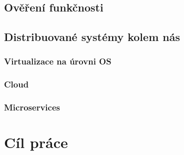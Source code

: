 \documentclass[
  master,
  biblatex,
  glossaries,
  index
]{kidiplom}
\begin{document}
\subsection{Ověření funkčnosti}

\subsection{Distribuované systémy kolem nás}

\subsubsection{Virtualizace na úrovni OS}

\subsubsection{Cloud}

\subsubsection{Microservices}


\section{Cíl práce}

\printbibliography
\end{document}
